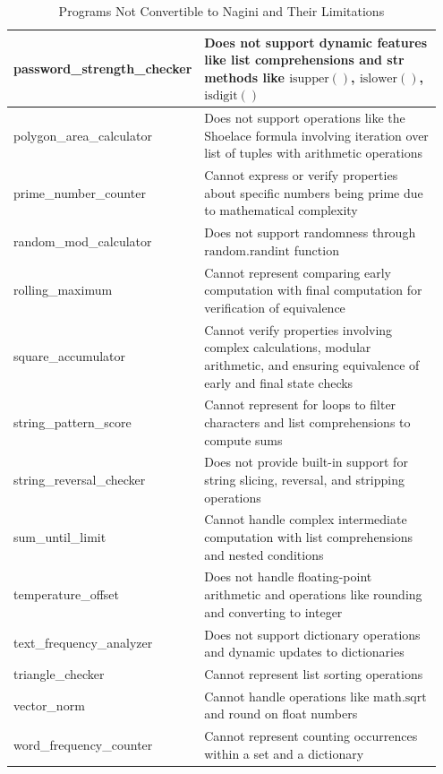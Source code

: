\documentclass[8pt]{extarticle}
\begin{document}
\begin{table}[H]
\begin{tabular}{|p{0.35\linewidth}|p{0.6\linewidth}|}
\hline
password\_strength\_checker & Does not support dynamic features like list comprehensions and str methods like $\text{isupper}()$, $\text{islower}()$, $\text{isdigit}()$ \\
\hline
polygon\_area\_calculator & Does not support operations like the Shoelace formula involving iteration over list of tuples with arithmetic operations \\
\hline
prime\_number\_counter & Cannot express or verify properties about specific numbers being prime due to mathematical complexity \\
\hline
random\_mod\_calculator & Does not support randomness through $\text{random.randint}$ function \\
\hline
rolling\_maximum & Cannot represent comparing early computation with final computation for verification of equivalence \\
\hline
square\_accumulator & Cannot verify properties involving complex calculations, modular arithmetic, and ensuring equivalence of early and final state checks \\
\hline
string\_pattern\_score & Cannot represent for loops to filter characters and list comprehensions to compute sums \\
\hline
string\_reversal\_checker & Does not provide built-in support for string slicing, reversal, and stripping operations \\
\hline
sum\_until\_limit & Cannot handle complex intermediate computation with list comprehensions and nested conditions \\
\hline
temperature\_offset & Does not handle floating-point arithmetic and operations like rounding and converting to integer \\
\hline
text\_frequency\_analyzer & Does not support dictionary operations and dynamic updates to dictionaries \\
\hline
triangle\_checker & Cannot represent list sorting operations \\
\hline
vector\_norm & Cannot handle operations like $\text{math.sqrt}$ and $\text{round}$ on float numbers \\
\hline
word\_frequency\_counter & Cannot represent counting occurrences within a set and a dictionary \\
\hline
\end{tabular}
\caption{Programs Not Convertible to Nagini and Their Limitations}
\label{tab:nagini-unsupported-programs}
\end{table}
\end{document}
